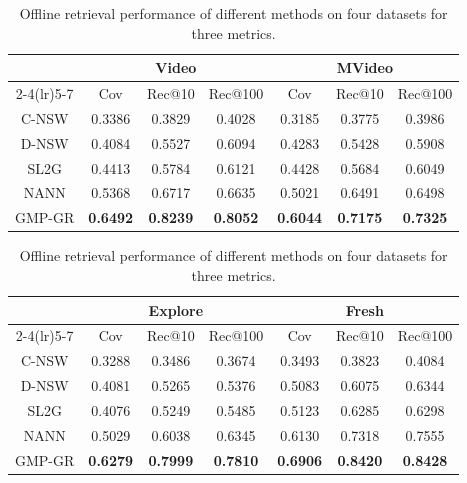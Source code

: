 \begin{table}[t]
    \centering
    \caption{Offline retrieval performance of different methods on four datasets for three metrics.}
    \label{gmpgr:tab:overall}
    \begin{tabular}{@{}c*{6}{c}@{}}
        \toprule
        & \multicolumn{3}{c}{Video} & \multicolumn{3}{c}{MVideo} \\
        \cmidrule(lr){2-4}\cmidrule(lr){5-7}
        & Cov & Rec@10 & Rec@100 & Cov & Rec@10 & Rec@100 \\
        \midrule
        C-NSW & 0.3386 & 0.3829 & 0.4028 & 0.3185 & 0.3775 & 0.3986 \\
        D-NSW & 0.4084 & 0.5527 & 0.6094 & 0.4283 & 0.5428 & 0.5908 \\
        SL2G & 0.4413 & 0.5784 & 0.6121 & 0.4428 & 0.5684 & 0.6049 \\
        NANN & 0.5368 & 0.6717 & 0.6635 & 0.5021 & 0.6491 & 0.6498 \\
        \midrule
        GMP-GR & \textbf{0.6492} & \textbf{0.8239} & \textbf{0.8052} & \textbf{0.6044} & \textbf{0.7175} & \textbf{0.7325} \\
        \bottomrule
    \end{tabular}

    \medskip
    \begin{tabular}{@{}c*{6}{c}@{}}
        \toprule
        & \multicolumn{3}{c}{Explore} & \multicolumn{3}{c}{Fresh} \\
        \cmidrule(lr){2-4}\cmidrule(lr){5-7}
        & Cov & Rec@10 & Rec@100 & Cov & Rec@10 & Rec@100 \\
        \midrule
        C-NSW & 0.3288 & 0.3486 & 0.3674 & 0.3493 & 0.3823 & 0.4084 \\
        D-NSW & 0.4081 & 0.5265 & 0.5376 & 0.5083 & 0.6075 & 0.6344 \\
        SL2G & 0.4076 & 0.5249 & 0.5485 & 0.5123 & 0.6285 & 0.6298 \\
        NANN & 0.5029 & 0.6038 & 0.6345 & 0.6130 & 0.7318 & 0.7555 \\
        \midrule
        GMP-GR & \textbf{0.6279} & \textbf{0.7999} & \textbf{0.7810} & \textbf{0.6906} & \textbf{0.8420} & \textbf{0.8428} \\
        \bottomrule
    \end{tabular}
\end{table}

